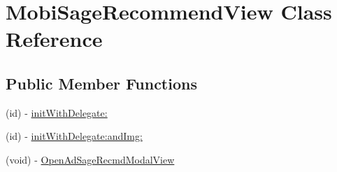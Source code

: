 \hypertarget{interface_mobi_sage_recommend_view}{\section{\-Mobi\-Sage\-Recommend\-View \-Class \-Reference}
\label{interface_mobi_sage_recommend_view}
}
\subsection*{\-Public \-Member \-Functions}
\begin{DoxyCompactItemize}
\item 
(id) -\/ \hyperlink{interface_mobi_sage_recommend_view_abf46a7dbcc534653952ae5d7fb1a5b39}{init\-With\-Delegate\-:}
\item 
(id) -\/ \hyperlink{interface_mobi_sage_recommend_view_a104f422b7c0d4f262ee57cd30ac02893}{init\-With\-Delegate\-:and\-Img\-:}
\item 
(void) -\/ \hyperlink{interface_mobi_sage_recommend_view_a76b129e27f7800f8a9066091414ee6d2}{\-Open\-Ad\-Sage\-Recmd\-Modal\-View}
\end{DoxyCompactItemize}



